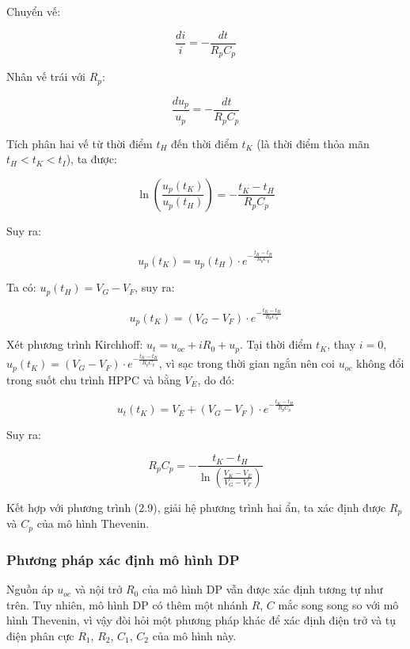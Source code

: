 \documentclass{thesis}
\begin{document}
Chuyển vế:

\begin{equation}
\frac{di}{i} = -\frac{dt}{R_p C_p} 
\end{equation}

Nhân vế trái với \( R_p \):

\begin{equation}
\frac{du_p}{u_p} = -\frac{dt}{R_p C_p} 
\end{equation}

Tích phân hai vế từ thời điểm \( t_H \) đến thời điểm \( t_K \) (là thời điểm thỏa mãn \( t_H < t_K < t_I \)), ta được:

\begin{equation}
\ln\left(\frac{u_p(t_K)}{u_p(t_H)}\right) = -\frac{t_K - t_H}{R_p C_p} 
\end{equation}

Suy ra:

\begin{equation}
u_p(t_K) = u_p(t_H) \cdot e^{-\frac{t_K - t_H}{R_p C_p}} 
\end{equation}

Ta có: \( u_p(t_H) = V_G - V_F \), suy ra:

\begin{equation}
u_p(t_K) = (V_G - V_F) \cdot e^{-\frac{t_K - t_H}{R_p C_p}} 
\end{equation}

Xét phương trình Kirchhoff: \( u_t = u_{oc} + i R_0 + u_p \). Tại thời điểm \( t_K \), thay \( i = 0 \), \( u_p(t_K) = (V_G - V_F) \cdot e^{-\frac{t_K - t_H}{R_p C_p}} \), vì sạc trong thời gian ngắn nên coi \( u_{oc} \) không đổi trong suốt chu trình HPPC và bằng \( V_E \), do đó:

\begin{equation}
u_t(t_K) = V_E + (V_G - V_F) \cdot e^{-\frac{t_K - t_H}{R_p C_p}} 
\end{equation}

Suy ra:

\begin{equation}
R_p C_p = -\frac{t_K - t_H}{\ln\left(\frac{V_K - V_E}{V_G - V_F}\right)} 
\end{equation}

Kết hợp với phương trình (2.9), giải hệ phương trình hai ẩn, ta xác định được \( R_p \) và \( C_p \) của mô hình Thevenin.

\subsubsection{Phương pháp xác định mô hình DP}
Nguồn áp \( u_{oc} \) và nội trở \( R_0 \) của mô hình DP vẫn được xác định tương tự như trên. Tuy nhiên, mô hình DP có thêm một nhánh \( R \), \( C \) mắc song song so với mô hình Thevenin, vì vậy đòi hỏi một phương pháp khác để xác định điện trở và tụ điện phân cực \( R_1 \), \( R_2 \), \( C_1 \), \( C_2 \) của mô hình này.
\end{document}
